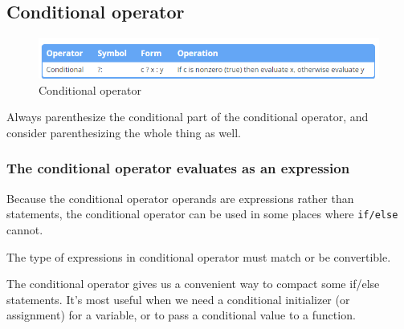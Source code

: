 \documentclass[
  letterpaper,
  DIV=11,
  numbers=noendperiod]{scrreprt}
\begin{document}
\hypertarget{conditional-operator}{%
\subsection{Conditional operator}\label{conditional-operator}}

\begin{figure}

{\centering \includegraphics{./figure/conditionalOperator.PNG}

}

\caption{Conditional operator}

\end{figure}

Always parenthesize the conditional part of the conditional operator,
and consider parenthesizing the whole thing as well.

\hypertarget{the-conditional-operator-evaluates-as-an-expression}{%
\subsubsection{The conditional operator evaluates as an
expression}\label{the-conditional-operator-evaluates-as-an-expression}}

Because the conditional operator operands are expressions rather than
statements, the conditional operator can be used in some places where
\texttt{if/else} cannot.

\begin{tcolorbox}[enhanced jigsaw, toprule=.15mm, rightrule=.15mm, opacityback=0, breakable, leftrule=.75mm, colback=white, colframe=quarto-callout-warning-color-frame, arc=.35mm, left=2mm, bottomrule=.15mm]
\begin{minipage}[t]{5.5mm}
\textcolor{quarto-callout-warning-color}{\faExclamationTriangle}
\end{minipage}%
\begin{minipage}[t]{\textwidth - 5.5mm}

The type of expressions in conditional operator must match or be
convertible.

\end{minipage}%
\end{tcolorbox}

The conditional operator gives us a convenient way to compact some
if/else statements. It's most useful when we need a conditional
initializer (or assignment) for a variable, or to pass a conditional
value to a function.
\end{document}
